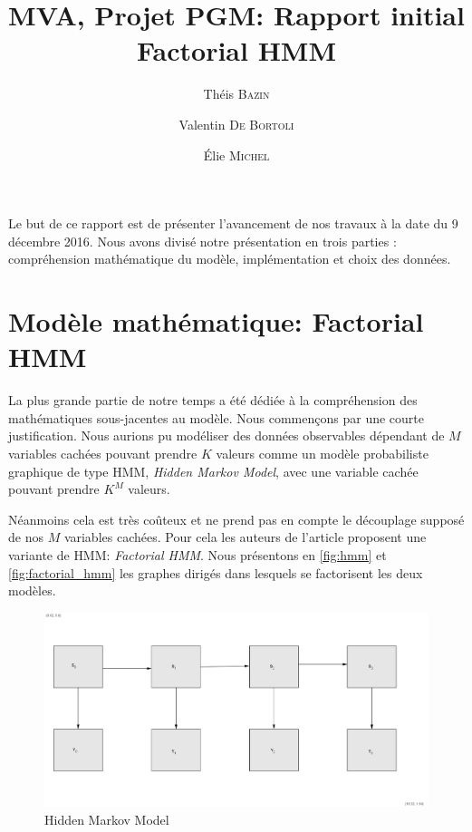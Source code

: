 \documentclass[10pt,a4paper]{article}
\title{MVA, Projet PGM: Rapport initial\\
  Factorial HMM}
\author{Théis \textsc{Bazin} \and Valentin \textsc{De Bortoli} \and Élie \textsc{Michel}}
\newcommand{\hmm}{\textsc{HMM}}
\begin{document}
\maketitle

Le but de ce rapport est de présenter l'avancement de nos travaux à la date du
9 décembre 2016.
Nous avons divisé notre présentation en trois parties : compréhension
mathématique du modèle, implémentation et choix des données.

\section{Modèle mathématique: Factorial HMM}

La plus grande partie de notre temps a été dédiée à la compréhension des
mathématiques sous-jacentes au modèle.
Nous commençons par une courte justification. Nous aurions pu modéliser des
données observables dépendant de $M$ variables cachées pouvant prendre $K$
valeurs comme un modèle probabiliste graphique de type \hmm,
\emph{Hidden Markov Model}, avec une variable cachée pouvant prendre
$K^M$ valeurs.

Néanmoins cela est très coûteux et ne prend pas en compte le découplage supposé
de nos $M$ variables cachées.
Pour cela les auteurs de l'article proposent une variante de \hmm :
\emph{Factorial HMM}.
Nous présentons en \autoref{fig:hmm} et \autoref{fig:factorial_hmm} les graphes
dirigés dans lesquels se factorisent les deux modèles.

\begin{figure}[hpbt]
  \centering
    \includegraphics[scale=0.6]{../resources/pictures/hmm.png}
  \caption{Hidden Markov Model\label{fig:hmm}}
\end{figure}
\end{document}
